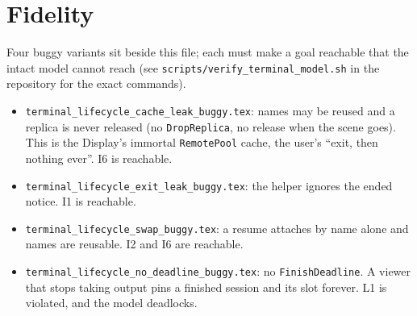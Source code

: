 \documentclass[a4paper,10pt,fleqn]{article}
\begin{document}
\section{Fidelity}

Four buggy variants sit beside this file; each must make a goal reachable
that the intact model cannot reach (see \texttt{scripts/verify\_terminal\_model.sh}
in the repository for the exact commands).
\begin{itemize}
  \item \texttt{terminal\_lifecycle\_cache\_leak\_buggy.tex}: names may be
    reused and a replica is never released (no \texttt{DropReplica}, no
    release when the scene goes).  This is the Display's immortal
    \texttt{RemotePool} cache, the user's ``exit, then nothing ever''.
    I6 is reachable.
  \item \texttt{terminal\_lifecycle\_exit\_leak\_buggy.tex}: the helper
    ignores the ended notice.  I1 is reachable.
  \item \texttt{terminal\_lifecycle\_swap\_buggy.tex}: a resume attaches by
    name alone and names are reusable.  I2 and I6 are reachable.
  \item \texttt{terminal\_lifecycle\_no\_deadline\_buggy.tex}: no
    \texttt{FinishDeadline}.  A viewer that stops taking output pins a
    finished session and its slot forever.  L1 is violated, and the
    model deadlocks.
\end{itemize}
\end{document}
